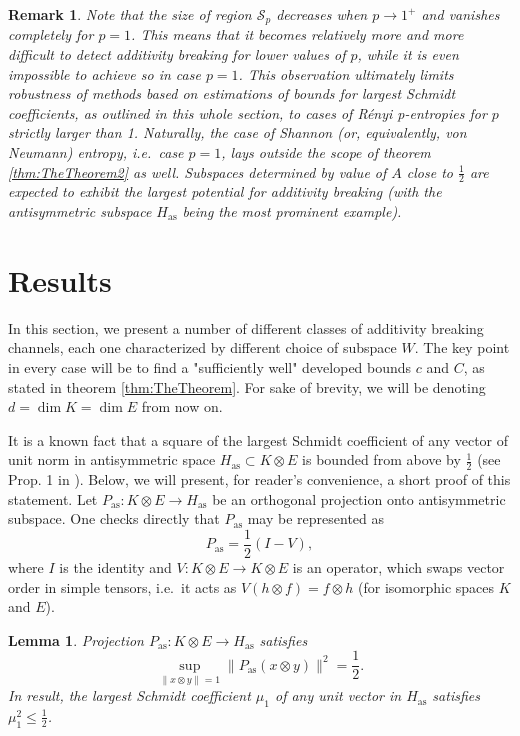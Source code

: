 \documentclass[reqno]{amsart}
\theoremstyle{plain}
\newtheorem{lemma}[theorem]{Lemma}
\theoremstyle{note}
\newtheorem{remark}[theorem]{Remark}
\newcommand{\aspace}{H_{\mathrm{as}}}
\begin{document}
\begin{remark}
Note that the size of region $\mathcal{S}_p$ decreases when $p\to 1^+$ and vanishes completely for $p = 1$. This means that it becomes relatively more and more difficult to detect additivity breaking for lower values of $p$, while it is even impossible to achieve so in case $p=1$. This observation ultimately limits robustness of methods based on estimations of bounds for largest Schmidt coefficients, as outlined in this whole section, to cases of R\'{e}nyi \textit{p}-entropies for $p$ strictly larger than 1. Naturally, the case of Shannon (or, equivalently, von Neumann) entropy, i.e.~case $p=1$, lays outside the scope of theorem \ref{thm:TheTheorem2} as well. Subspaces determined by value of $A$ close to $\frac{1}{2}$ are expected to exhibit the largest potential for additivity breaking (with the antisymmetric subspace $\aspace$ being the most prominent example).
\end{remark}

\section{Results}
\label{sec:Results}

In this section, we present a number of different classes of additivity breaking channels, each one characterized by different choice of subspace $W$. The key point in every case will be to find a "sufficiently well" developed bounds $c$ and $C$, as stated in theorem \ref{thm:TheTheorem}. For sake of brevity, we will be denoting $d = \dim{K} = \dim{E}$ from now on.

It is a known fact that a square of the largest Schmidt coefficient of any vector of unit norm in antisymmetric space $\aspace \subset K \otimes E$ is bounded from above by $\frac{1}{2}$  (see Prop. 1 in \cite{Grudka_2010}). Below, we will present, for reader's convenience, a short proof of this statement. Let $P_{\mathrm{as}} : K\otimes E \to \aspace$ be an orthogonal projection onto antisymmetric subspace. One checks directly that $P_{\mathrm{as}}$ may be represented as
\begin{equation}\label{eq:PasDecomposition}
    P_{\mathrm{as}} = \frac{1}{2} (I - V),
\end{equation}
where $I$ is the identity and $V : K\otimes E \to K \otimes E$ is an operator, which swaps vector order in simple tensors, i.e.~it acts as $V(h \otimes f) = f \otimes h$ (for isomorphic spaces $K$ and $E$).
\begin{lemma}\label{lemma:PasInequality}
Projection $P_{\mathrm{as}} : K\otimes E \to \aspace$ satisfies
\begin{equation}
    \sup_{\| x \otimes y\| = 1}{\| P_{\mathrm{as}}(x\otimes y) \|^{2}} = \frac{1}{2}.
\end{equation}
In result, the largest Schmidt coefficient $\mu_{1}$ of any unit vector in $\aspace$ satisfies $\mu_{1}^{2} \leqslant \frac{1}{2}$.
\end{lemma}
\end{document}

